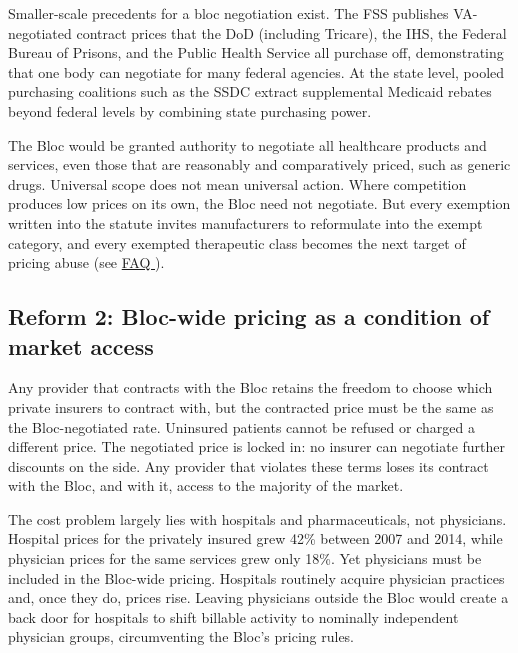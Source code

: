 \documentclass[12pt]{article}
\begin{document}
Smaller-scale precedents for a bloc negotiation exist. The \ac{FSS} publishes \ac{VA}-negotiated contract prices that the \ac{DoD} (including Tricare), the \ac{IHS}, the Federal Bureau of Prisons, and the Public Health Service all purchase off,\citep{cbo2021drugprices, vafss2026} demonstrating that one body can negotiate for many federal agencies. At the state level, pooled purchasing coalitions such as the \ac{SSDC} extract supplemental Medicaid rebates beyond federal levels by combining state purchasing power.\citep{oig2014supplementalrebates, horvath2019purchasing}

The Bloc would be granted authority to negotiate all healthcare products and services, even those that are reasonably and comparatively priced, such as generic drugs. Universal scope does not mean universal action. Where competition produces low prices on its own, the Bloc need not negotiate. But every exemption written into the statute invites manufacturers to reformulate into the exempt category, and every exempted therapeutic class becomes the next target of pricing abuse (see \href{https://rabbanimaysam.github.io/health_reform/faq.html}{FAQ \faqComprehensiveScope}).

\subsection*{Reform 2: Bloc-wide pricing as a condition of market access}

Any provider that contracts with the Bloc retains the freedom to choose which private insurers to contract with, but the contracted price must be the same as the Bloc-negotiated rate. Uninsured patients cannot be refused or charged a different price. The negotiated price is locked in: no insurer can negotiate further discounts on the side. Any provider that violates these terms loses its contract with the Bloc, and with it, access to the majority of the market.

The cost problem largely lies with hospitals and pharmaceuticals, not physicians. Hospital prices for the privately insured grew 42\% between 2007 and 2014, while physician prices for the same services grew only 18\%.\citep{cooper2019hospitalprice, cooper2019price, gowrisankaran2015mergers, dafny2009mergers} Yet physicians must be included in the Bloc-wide pricing. Hospitals routinely acquire physician practices and, once they do, prices rise.\citep{cooper2025physicianacquisitions} Leaving physicians outside the Bloc would create a back door for hospitals to shift billable activity to nominally independent physician groups, circumventing the Bloc's pricing rules.
\end{document}

